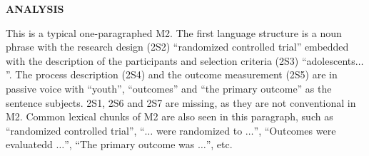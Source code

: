 \documentclass{ctexbook}
\begin{document}
\begin{sample}[label={myautocounter}]{\heiti}
  \noindent \textbf{ANALYSIS}

  This is a typical one-paragraphed M2. The first language structure is a noun phrase with the research design (2S2) ``randomized controlled trial'' embedded with the description of the participants and selection criteria (2S3) ``adolescents$\dots$''. The process description (2S4) and the outcome measurement (2S5) are in passive voice with ``youth'', ``outcomes'' and ``the primary outcome'' as the sentence subjects. 2S1, 2S6 and 2S7 are missing, as they are not conventional in M2. Common lexical chunks of M2 are also seen in this paragraph, such as ``randomized controlled trial'', ``$\dots$ were randomized to $\dots$'', ``Outcomes were evaluatedd $\dots$'', ``The primary outcome was $\dots$'', etc.

\end{sample}
\end{document}
